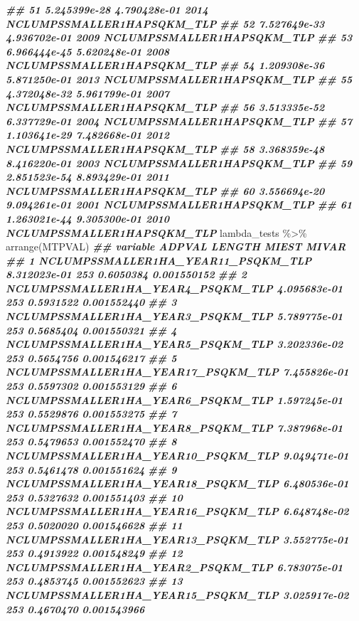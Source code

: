 \documentclass[10pt,landscape,a3paper]{article}
\newenvironment{Shaded}{\begin{snugshade}}{\end{snugshade}}
\newcommand{\DocumentationTok}[1]{\textcolor[rgb]{0.56,0.35,0.01}{\textbf{\textit{#1}}}}
\newcommand{\FunctionTok}[1]{\textcolor[rgb]{0.00,0.00,0.00}{#1}}
\newcommand{\NormalTok}[1]{#1}
\newcommand{\SpecialCharTok}[1]{\textcolor[rgb]{0.00,0.00,0.00}{#1}}
\begin{document}
\begin{Shaded}
\begin{Highlighting}[]
\DocumentationTok{\#\# 51 5.245399e{-}28 4.790428e{-}01 2014 NCLUMPSSMALLER1HAPSQKM\_TLP}
\DocumentationTok{\#\# 52 7.527649e{-}33 4.936702e{-}01 2009 NCLUMPSSMALLER1HAPSQKM\_TLP}
\DocumentationTok{\#\# 53 6.966444e{-}45 5.620248e{-}01 2008 NCLUMPSSMALLER1HAPSQKM\_TLP}
\DocumentationTok{\#\# 54 1.209308e{-}36 5.871250e{-}01 2013 NCLUMPSSMALLER1HAPSQKM\_TLP}
\DocumentationTok{\#\# 55 4.372048e{-}32 5.961799e{-}01 2007 NCLUMPSSMALLER1HAPSQKM\_TLP}
\DocumentationTok{\#\# 56 3.513335e{-}52 6.337729e{-}01 2004 NCLUMPSSMALLER1HAPSQKM\_TLP}
\DocumentationTok{\#\# 57 1.103641e{-}29 7.482668e{-}01 2012 NCLUMPSSMALLER1HAPSQKM\_TLP}
\DocumentationTok{\#\# 58 3.368359e{-}48 8.416220e{-}01 2003 NCLUMPSSMALLER1HAPSQKM\_TLP}
\DocumentationTok{\#\# 59 2.851523e{-}54 8.893429e{-}01 2011 NCLUMPSSMALLER1HAPSQKM\_TLP}
\DocumentationTok{\#\# 60 3.556694e{-}20 9.094261e{-}01 2001 NCLUMPSSMALLER1HAPSQKM\_TLP}
\DocumentationTok{\#\# 61 1.263021e{-}44 9.305300e{-}01 2010 NCLUMPSSMALLER1HAPSQKM\_TLP}
\NormalTok{lambda\_tests }\SpecialCharTok{\%\textgreater{}\%} \FunctionTok{arrange}\NormalTok{(MTPVAL)}
\DocumentationTok{\#\#                              variable       ADPVAL LENGTH     MIEST       MIVAR}
\DocumentationTok{\#\# 1  NCLUMPSSMALLER1HA\_YEAR11\_PSQKM\_TLP 8.312023e{-}01    253 0.6050384 0.001550152}
\DocumentationTok{\#\# 2   NCLUMPSSMALLER1HA\_YEAR4\_PSQKM\_TLP 4.095683e{-}01    253 0.5931522 0.001552440}
\DocumentationTok{\#\# 3   NCLUMPSSMALLER1HA\_YEAR3\_PSQKM\_TLP 5.789775e{-}01    253 0.5685404 0.001550321}
\DocumentationTok{\#\# 4   NCLUMPSSMALLER1HA\_YEAR5\_PSQKM\_TLP 3.202336e{-}02    253 0.5654756 0.001546217}
\DocumentationTok{\#\# 5  NCLUMPSSMALLER1HA\_YEAR17\_PSQKM\_TLP 7.455826e{-}01    253 0.5597302 0.001553129}
\DocumentationTok{\#\# 6   NCLUMPSSMALLER1HA\_YEAR6\_PSQKM\_TLP 1.597245e{-}01    253 0.5529876 0.001553275}
\DocumentationTok{\#\# 7   NCLUMPSSMALLER1HA\_YEAR8\_PSQKM\_TLP 7.387968e{-}01    253 0.5479653 0.001552470}
\DocumentationTok{\#\# 8  NCLUMPSSMALLER1HA\_YEAR10\_PSQKM\_TLP 9.049471e{-}01    253 0.5461478 0.001551624}
\DocumentationTok{\#\# 9  NCLUMPSSMALLER1HA\_YEAR18\_PSQKM\_TLP 6.480536e{-}01    253 0.5327632 0.001551403}
\DocumentationTok{\#\# 10 NCLUMPSSMALLER1HA\_YEAR16\_PSQKM\_TLP 6.648748e{-}02    253 0.5020020 0.001546628}
\DocumentationTok{\#\# 11 NCLUMPSSMALLER1HA\_YEAR13\_PSQKM\_TLP 3.552775e{-}01    253 0.4913922 0.001548249}
\DocumentationTok{\#\# 12  NCLUMPSSMALLER1HA\_YEAR2\_PSQKM\_TLP 6.783075e{-}01    253 0.4853745 0.001552623}
\DocumentationTok{\#\# 13 NCLUMPSSMALLER1HA\_YEAR15\_PSQKM\_TLP 3.025917e{-}02    253 0.4670470 0.001543966}

\end{Highlighting}
\end{Shaded}
\end{document}

